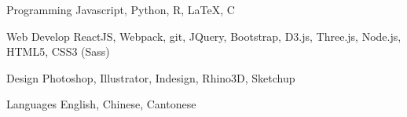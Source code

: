 

\begin{cvskills}

  \cvskill
    {Programming} %
    {Javascript, Python, R, LaTeX, C} %

  \cvskill
    {Web Develop} %
    {ReactJS, Webpack, git, JQuery, Bootstrap, D3.js, Three.js, Node.js, HTML5, CSS3 (Sass) } %

  \cvskill
    {Design} %
    {Photoshop, Illustrator, Indesign, Rhino3D, Sketchup} %

  \cvskill
    {Languages} %
    {English, Chinese, Cantonese} %

\end{cvskills}
